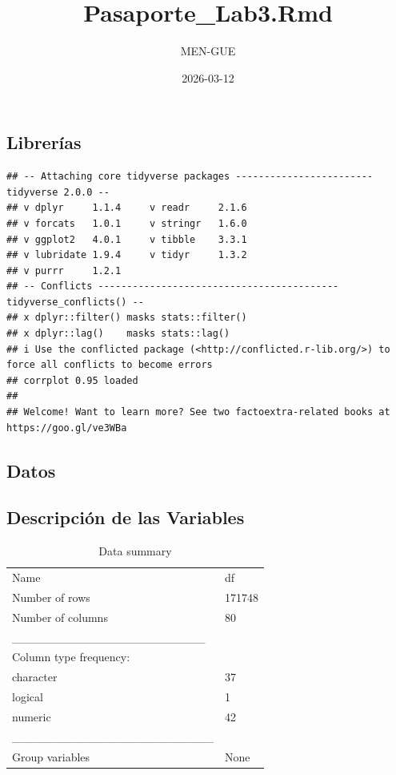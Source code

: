 \documentclass[
]{article}
\title{Pasaporte\_Lab3.Rmd}
\author{MEN-GUE}
\date{2026-03-12}
\begin{document}
\maketitle

\subsection{Librerías}\label{libreruxedas}

\begin{verbatim}
## -- Attaching core tidyverse packages ------------------------ tidyverse 2.0.0 --
## v dplyr     1.1.4     v readr     2.1.6
## v forcats   1.0.1     v stringr   1.6.0
## v ggplot2   4.0.1     v tibble    3.3.1
## v lubridate 1.9.4     v tidyr     1.3.2
## v purrr     1.2.1     
## -- Conflicts ------------------------------------------ tidyverse_conflicts() --
## x dplyr::filter() masks stats::filter()
## x dplyr::lag()    masks stats::lag()
## i Use the conflicted package (<http://conflicted.r-lib.org/>) to force all conflicts to become errors
## corrplot 0.95 loaded
## 
## Welcome! Want to learn more? See two factoextra-related books at https://goo.gl/ve3WBa
\end{verbatim}

\subsection{Datos}\label{datos}

\subsection{Descripción de las
Variables}\label{descripciuxf3n-de-las-variables}

\begin{longtable}[]{@{}ll@{}}
\caption{Data summary}\tabularnewline
\toprule\noalign{}
\endfirsthead
\endhead
\bottomrule\noalign{}
\endlastfoot
Name & df \\
Number of rows & 171748 \\
Number of columns & 80 \\
\_\_\_\_\_\_\_\_\_\_\_\_\_\_\_\_\_\_\_\_\_\_\_ & \\
Column type frequency: & \\
character & 37 \\
logical & 1 \\
numeric & 42 \\
\_\_\_\_\_\_\_\_\_\_\_\_\_\_\_\_\_\_\_\_\_\_\_\_ & \\
Group variables & None \\
\end{longtable}
\end{document}
